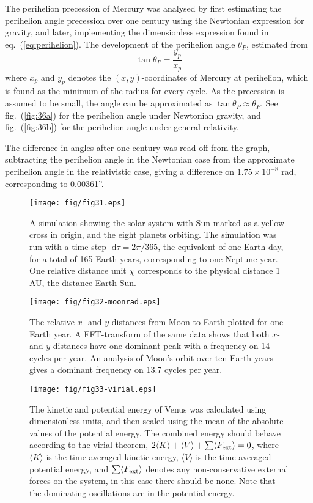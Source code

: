 \documentclass[a4paper,11pt]{article}
\newcommand{\diff}{\ensuremath{\; \text{d}}}
\begin{document}
The perihelion precession of Mercury was analysed by first estimating the perihelion angle precession over one century using the Newtonian expression for gravity, and later, implementing the dimensionless expression found in eq.~(\ref{eq:perihelion}). The development of the perihelion angle $\theta_P$, estimated from 
\[ \tan \theta_P = \frac{y_p}{x_p} \]
where $x_p$ and $y_p$ denotes the $(x,y)$-coordinates of Mercury at perihelion, which is found as the minimum of the radius for every cycle. As the precession is assumed to be small, the angle can be approximated as $\tan \theta_P \approx \theta_P$. See fig.~(\ref{fig:36a}) for the perihelion angle under Newtonian gravity, and fig.~(\ref{fig:36b}) for the perihelion angle under general relativity.

The difference in angles after one century was read off from the graph, subtracting the perihelion angle in the Newtonian case from the approximate perihelion angle in the relativistic case, giving a difference on $1.75\times 10^{-8}$ rad, corresponding to 0.00361''. 

\begin{figure}[htb]
    \centering
    \texttt{[image: fig/fig31.eps]}
    \caption{A simulation showing the solar system with Sun marked as a yellow cross in origin, and the eight planets orbiting. The simulation was run with a time step $\diff \tau = 2\pi/365$, the equivalent of one Earth day, for a total of 165 Earth years, corresponding to one Neptune year. One relative distance unit $\chi$ corresponds to the physical distance 1 AU, the distance Earth-Sun. }
    \label{fig:31}
\end{figure}

\begin{figure}[htb]
    \centering
    \texttt{[image: fig/fig32-moonrad.eps]}
    \caption{The relative $x$- and $y$-distances from Moon to Earth plotted for one Earth year. A FFT-transform of the same data shows that both $x$- and $y$-distances have one dominant peak with a frequency on 14 cycles per year. An analysis of Moon's orbit over ten Earth years gives a dominant frequency on 13.7 cycles per year.}
    \label{fig:32}
\end{figure}

\begin{figure}[htb]
    \centering
    \texttt{[image: fig/fig33-virial.eps]}
    \caption{The kinetic and potential energy of Venus was calculated using dimensionless units, and then scaled using the mean of the absolute values of the potential energy. The combined energy should behave according to the virial theorem, $2\langle K \rangle + \langle V \rangle + \sum \langle F_{\rm ext} \rangle = 0$, where $\langle K \rangle$ is the time-averaged kinetic energy, $\langle V \rangle $ is the time-averaged potential energy, and $\sum \langle F_{\rm ext} \rangle$ denotes any non-conservative external forces on the system, in this case there should be none. Note that the dominating oscillations are in the potential energy.}
    \label{fig:33}
\end{figure}
\end{document}

